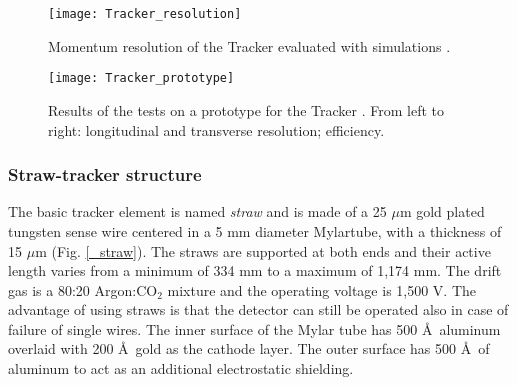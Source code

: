 \documentclass[12pt,a4paper,openright, oneside, titlepage]{book} %
\begin{document}
\begin{figure}[h!]
\centering
\texttt{[image: Tracker\_resolution]}
\caption{Momentum resolution of the Tracker evaluated with  simulations \cite{Giovannella}.}
\label{_Tracker_resolution}
\end{figure}

\begin{figure}[h!]
\centering
\texttt{[image: Tracker\_prototype]}
\caption{Results of the tests on a prototype for the Tracker \cite{Giovannella}. From left to right: longitudinal and transverse resolution; efficiency.}
\label{_Tracker_prototype}
\end{figure}

\subsubsection{Straw-tracker structure}
The basic tracker element is named \textit{straw} and is made of 
a 25 $\mu$m gold plated tungsten sense wire centered in a 5 mm diameter Mylar\textsuperscript\textregistered  tube, 
with a thickness of 15 $\mu$m (Fig. \ref{_straw}). 
The straws are supported at both ends and their active length varies from a minimum of 334 mm to a maximum of 1,174 mm.
The drift gas is a 80:20 Argon:CO$_2$ mixture and the operating voltage is 1,500 V. The advantage of using straws
is that the detector can still be operated also in case of failure of single wires.
The inner surface of the Mylar tube has 500 \AA\ aluminum overlaid with 200 \AA\ gold as the cathode layer. 
The outer surface has 500 \AA\ of aluminum to act as an additional electrostatic shielding.\\
\end{document}
